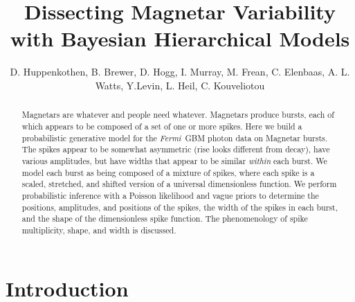 \documentclass[12pt]{emulateapj}
\newcommand{\project}[1]{\textsl{#1}}
\newcommand{\Fermi}{\project{Fermi}}
\begin{document}
\title{Dissecting Magnetar Variability with Bayesian Hierarchical Models}

\author{D. Huppenkothen, B. Brewer\altaffilmark{}, D. Hogg\altaffilmark{}, I. Murray\altaffilmark{}, M. Frean\altaffilmark{}, C. Elenbaas, A. L. Watts, Y.Levin\altaffilmark{},  L. Heil, C. Kouveliotou}

 



\begin{abstract}
Magnetars are whatever and people need whatever.
Magnetars produce bursts,
  each of which appears to be composed of a set of one or more spikes.
Here we build a probabilistic generative model for the \Fermi\ GBM photon data on Magnetar bursts.
The spikes appear to be somewhat asymmetric
  (rise looks different from decay),
  have various amplitudes,
  but have widths that appear to be similar \emph{within} each burst.
We model each burst as being composed of a mixture of spikes,
  where each spike is a scaled, stretched, and shifted version of a universal dimensionless function.
We perform probabilistic inference with a Poisson likelihood and vague priors to determine
  the positions, amplitudes, and positions of the spikes,
  the width of the spikes in each burst,
  and the shape of the dimensionless spike function.
The phenomenology of spike multiplicity, shape, and width is discussed.
\end{abstract}


\section{Introduction}
\end{document}
